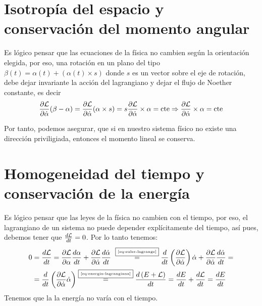 \section{Isotropía del espacio y conservación del momento angular}\label{sec:isotropia-del-espacio-y-conservacion-del-momento-angular}
Es lógico pensar que las ecuaciones de la física no cambien según la orientación elegida, por eso, una rotación en un plano del tipo $\beta(t)=\alpha(t) + (\alpha(t)\times s)$ donde $s$ es un vector sobre el eje de rotación, debe dejar invariante la acción del lagrangiano y dejar el flujo de Noether constante, es decir
\begin{equation}
	\label{eq:conservacion_momento_angular}
	\frac{\partial \mathcal{L}}{\partial\dot{\alpha}}(\beta-\alpha) = \frac{\partial \mathcal{L}}{\partial\dot{\alpha}}(\alpha\times s) = s \frac{\partial \mathcal{L}}{\partial\dot{\alpha}}\times \alpha=\text{cte}\Rightarrow\frac{\partial \mathcal{L}}{\partial\dot{\alpha}}\times \alpha=\text{cte}
\end{equation}

Por tanto, podemos asegurar, que si en nuestro sistema físico no existe una dirección priviligiada, entonces el momento lineal se conserva.

\section{Homogeneidad del tiempo y conservación de la energía}\label{sec:homogeneidad-del-tiempo-y-conservacion-de-la-energia}

Es lógico pensar que las leyes de la física no cambien con el tiempo, por eso, el lagrangiano de un sistema no puede depender explícitamente del tiempo, así pues, debemos tener que $\frac{d\mathcal{L}}{dt}=0$.
Por lo tanto tenemos:
\begin{align*}
	0 & = \frac{d\mathcal{L}}{dt}=\frac{\partial \mathcal{L}}{\partial \alpha}\frac{d\alpha}{dt}+\frac{\partial \mathcal{L}}{\partial \dot{\alpha}}\frac{d\dot{\alpha}}{dt} ~\overset{\fbox{\tiny \ref{eq:euler-lagrange}}}{=} \frac{d}{dt}\left(\frac{\partial \mathcal{L}}{\partial \dot{\alpha}}\right)\dot{\alpha}+\frac{\partial \mathcal{L}}{\partial \dot{\alpha}}\frac{d\dot{\alpha}}{dt}=\\
	& = \frac{d}{dt}\left(\frac{\partial \mathcal{L}}{\partial \dot{\alpha}}\dot{\alpha}\right)\overset{\fbox{\tiny \ref{eq:energia-lagrangiana}}}{=}\frac{d\left(E+\mathcal{L}\right)}{dt}=\frac{d E}{dt}+\frac{d\mathcal{L}}{dt}=\frac{d E}{dt}
\end{align*}
Tenemos que la la energía no varía con el tiempo.
